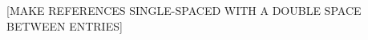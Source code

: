 \documentclass[12pt,chapterheads]{ucsd}
\begin{document}
%
%








[MAKE REFERENCES SINGLE-SPACED WITH A DOUBLE SPACE BETWEEN ENTRIES]
\printbibliography[segment=1,heading=subbibliography]


\printbibliography[segment=2,heading=subbibliography]

%

%

%
%
%
%
%
\end{document}
